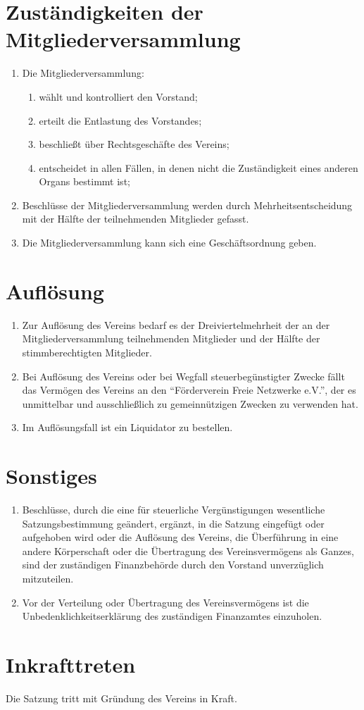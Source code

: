 \documentclass[ngerman]{article}
\begin{document}
\section{Zuständigkeiten der Mitgliederversammlung}
\begin{enumerate}
  \item Die Mitgliederversammlung:
  \begin{enumerate}
    \item wählt und kontrolliert den Vorstand;
    \item erteilt die Entlastung des Vorstandes;
    \item beschließt über Rechtsgeschäfte des Vereins;
    \item entscheidet in allen Fällen, in denen nicht die Zuständigkeit eines anderen Organs bestimmt ist;
  \end{enumerate}  
  \item Beschlüsse der Mitgliederversammlung werden durch Mehrheitsentscheidung mit der Hälfte der teilnehmenden Mitglieder gefasst.
  \item Die Mitgliederversammlung kann sich eine Geschäftsordnung geben.
\end{enumerate}


\section{Auflösung}
\begin{enumerate}
  \item Zur Auflösung des Vereins bedarf es der Dreiviertelmehrheit der an der Mitgliederversammlung teilnehmenden Mitglieder und der Hälfte der stimmberechtigten Mitglieder.
  \item Bei Auflösung des Vereins oder bei Wegfall steuerbegünstigter Zwecke fällt das Vermögen des Vereins an den "`Förderverein Freie Netzwerke e.V."', der es unmittelbar und ausschließlich zu gemeinnützigen Zwecken zu verwenden hat.
  \item Im Auflösungsfall ist ein Liquidator zu bestellen.
\end{enumerate}


\section{Sonstiges}
\begin{enumerate}
  \item Beschlüsse, durch die eine für steuerliche Vergünstigungen wesentliche Satzungsbestimmung geändert, ergänzt, in die Satzung eingefügt oder aufgehoben wird oder die Auflösung des Vereins, die Überführung in eine andere Körperschaft oder die Übertragung des Vereinsvermögens als Ganzes, sind der zuständigen Finanzbehörde durch den Vorstand unverzüglich mitzuteilen.
  \item Vor der Verteilung oder Übertragung des Vereinsvermögens ist die Unbedenklichkeitserklärung des zuständigen Finanzamtes einzuholen.
\end{enumerate}


\section{Inkrafttreten}
Die Satzung tritt mit Gründung des Vereins in Kraft.
\end{document}
